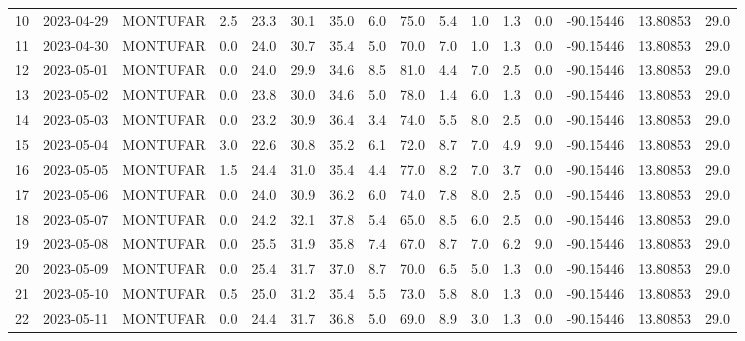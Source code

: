 \documentclass[12pt]{article}
\begin{document}
\begin{center}
\begin{tabular}{lllrrrrrrrrrrrrr}
10  & 2023-04-29 &  MONTUFAR &     2.5 &  23.3 &   30.1 &  35.0 &      6.0 &     75.0 &        5.4 &  1.0 &         1.3 &         0.0 & -90.15446 &  13.80853 &     29.0 \\
11  & 2023-04-30 &  MONTUFAR &     0.0 &  24.0 &   30.7 &  35.4 &      5.0 &     70.0 &        7.0 &  1.0 &         1.3 &         0.0 & -90.15446 &  13.80853 &     29.0 \\
12  & 2023-05-01 &  MONTUFAR &     0.0 &  24.0 &   29.9 &  34.6 &      8.5 &     81.0 &        4.4 &  7.0 &         2.5 &         0.0 & -90.15446 &  13.80853 &     29.0 \\
13  & 2023-05-02 &  MONTUFAR &     0.0 &  23.8 &   30.0 &  34.6 &      5.0 &     78.0 &        1.4 &  6.0 &         1.3 &         0.0 & -90.15446 &  13.80853 &     29.0 \\
14  & 2023-05-03 &  MONTUFAR &     0.0 &  23.2 &   30.9 &  36.4 &      3.4 &     74.0 &        5.5 &  8.0 &         2.5 &         0.0 & -90.15446 &  13.80853 &     29.0 \\
15  & 2023-05-04 &  MONTUFAR &     3.0 &  22.6 &   30.8 &  35.2 &      6.1 &     72.0 &        8.7 &  7.0 &         4.9 &         9.0 & -90.15446 &  13.80853 &     29.0 \\
16  & 2023-05-05 &  MONTUFAR &     1.5 &  24.4 &   31.0 &  35.4 &      4.4 &     77.0 &        8.2 &  7.0 &         3.7 &         0.0 & -90.15446 &  13.80853 &     29.0 \\
17  & 2023-05-06 &  MONTUFAR &     0.0 &  24.0 &   30.9 &  36.2 &      6.0 &     74.0 &        7.8 &  8.0 &         2.5 &         0.0 & -90.15446 &  13.80853 &     29.0 \\
18  & 2023-05-07 &  MONTUFAR &     0.0 &  24.2 &   32.1 &  37.8 &      5.4 &     65.0 &        8.5 &  6.0 &         2.5 &         0.0 & -90.15446 &  13.80853 &     29.0 \\
19  & 2023-05-08 &  MONTUFAR &     0.0 &  25.5 &   31.9 &  35.8 &      7.4 &     67.0 &        8.7 &  7.0 &         6.2 &         9.0 & -90.15446 &  13.80853 &     29.0 \\
20  & 2023-05-09 &  MONTUFAR &     0.0 &  25.4 &   31.7 &  37.0 &      8.7 &     70.0 &        6.5 &  5.0 &         1.3 &         0.0 & -90.15446 &  13.80853 &     29.0 \\
21  & 2023-05-10 &  MONTUFAR &     0.5 &  25.0 &   31.2 &  35.4 &      5.5 &     73.0 &        5.8 &  8.0 &         1.3 &         0.0 & -90.15446 &  13.80853 &     29.0 \\
22  & 2023-05-11 &  MONTUFAR &     0.0 &  24.4 &   31.7 &  36.8 &      5.0 &     69.0 &        8.9 &  3.0 &         1.3 &         0.0 & -90.15446 &  13.80853 &     29.0 \\

\end{tabular}
\end{center}
\end{document}
